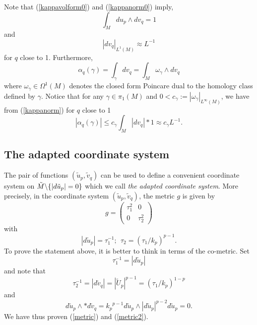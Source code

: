 \documentclass{ip-journal}
\theoremstyle{definition}
\numberwithin{equation}{section}
\begin{document}
Note that (\ref{kappavolform0}) and (\ref{kappanorm0}) imply,
\begin{equation} \label{kappavolform}
\int_Md  u_p \wedge dv_q=1
\end{equation}
and
\begin{equation} \label{kappanorm}
 |dv_q|_{L^1(M)} \approx L^{-1}
\end{equation}
for $q$ close to 1. Furthermore,
\begin{equation} \label{alphagamma}
\alpha_q(\gamma)=\int_{\gamma}  dv_q=\int_M \omega_\gamma \wedge dv_q 
\end{equation}
where  
$\omega_\gamma \in \Omega^1(M)$ denotes the closed form Poincare dual to the homology class defined by $\gamma$.
Notice that
for any $\gamma \in \pi_1(M)$ and $0<c_\gamma :=|\omega_\gamma|_{L^\infty(M)}$, we have from (\ref{kappanorm}) for $q$ close to 1
\begin{equation}\label{boundtrlength}
|\alpha_q(\gamma)| \leq c_\gamma \int_M  \left| dv_q \right|*1 \approx c_\gamma L^{-1}.
\end{equation}


 \subsection{The adapted coordinate system} \label{adapted} The pair of functions $(\tilde u_p, \tilde v_q)$ can be used to define a convenient coordinate system on  $\tilde M \backslash \mathcal \{| d\tilde u_p|=0\}$ which we call {\it{the adapted coordinate system}}. More precisely, in the coordinate system $(\tilde u_p, \tilde v_q)$,
the metric $g$ is given by
\begin{equation}
g=\begin{pmatrix} \label{metric}
 \tau_1^2 & 0 \\
 0 & \tau_2^2
\end{pmatrix}
\end{equation}
with
\begin{equation}\label{metric2}
|d \tilde u_p|=\tau_1^{-1}; \ \ \tau_2=  (\tau_1/{k_p})^{p-1}.
\end{equation}
To prove the statement above, it is better to think in terms of the co-metric. Set
\[
\tau_1^{-1}=\left| d\tilde u_p \right |
\]
and note that
\[
\tau_2^{-1}=|d\tilde v_q|=| \tilde U_p|^{p-1}= (\tau_1/{k_p})^{1-p}
\]
and
\[
d\tilde u_p \wedge *d\tilde v_q=  {k_p}^{p-1}d\tilde u_p \wedge |d  \tilde u_p|^{p-2}d \tilde u_p=0.
\]
We have thus proven (\ref{metric}) and (\ref{metric2}). 
\end{document}

